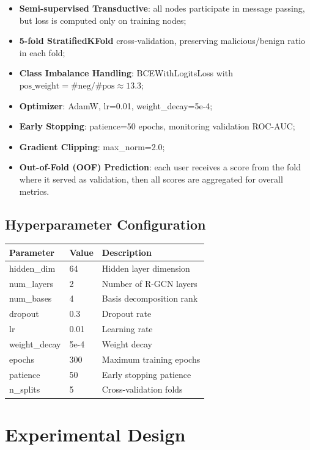 \documentclass[
  a4paper,
  11pt]{article}
\newcounter{none} %
\providecommand{\tightlist}{%
  \setlength{\itemsep}{0pt}\setlength{\parskip}{0pt}}
\begin{document}
\begin{itemize}
\tightlist
\item
  \textbf{Semi-supervised Transductive}: all nodes participate in
  message passing, but loss is computed only on training nodes;
\item
  \textbf{5-fold StratifiedKFold} cross-validation, preserving
  malicious/benign ratio in each fold;
\item
  \textbf{Class Imbalance Handling}: BCEWithLogitsLoss with
  $\mathrm{pos\_weight} = \#\mathrm{neg} / \#\mathrm{pos} \approx 13.3$;
\item
  \textbf{Optimizer}: AdamW, lr=0.01, weight\_decay=5e-4;
\item
  \textbf{Early Stopping}: patience=50 epochs, monitoring validation
  ROC-AUC;
\item
  \textbf{Gradient Clipping}: max\_norm=2.0;
\item
  \textbf{Out-of-Fold (OOF) Prediction}: each user receives a score from
  the fold where it served as validation, then all scores are aggregated
  for overall metrics.
\end{itemize}

\subsection{Hyperparameter
Configuration}\label{hyperparameter-configuration}

{\def\LTcaptype{none} %
\begin{longtable}[]{@{}L{0.24}L{0.26}L{0.42}@{}}
\toprule\noalign{}
Parameter & Value & Description \\
\midrule\noalign{}
\endhead
\bottomrule\noalign{}
\endlastfoot
hidden\_dim & 64 & Hidden layer dimension \\
num\_layers & 2 & Number of R-GCN layers \\
num\_bases & 4 & Basis decomposition rank \\
dropout & 0.3 & Dropout rate \\
lr & 0.01 & Learning rate \\
weight\_decay & 5e-4 & Weight decay \\
epochs & 300 & Maximum training epochs \\
patience & 50 & Early stopping patience \\
n\_splits & 5 & Cross-validation folds \\
\end{longtable}
}

\section{Experimental Design}\label{experimental-design}
\end{document}
